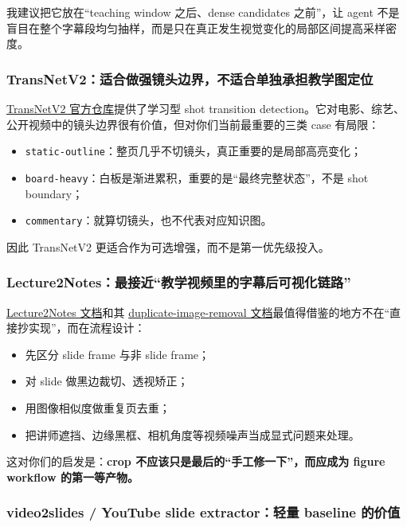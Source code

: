 \documentclass[a4paper]{article}
\begin{document}
我建议把它放在“teaching window 之后、dense candidates 之前”，让 agent 不是盲目在整个字幕段均匀抽样，而是只在真正发生视觉变化的局部区间提高采样密度。

\subsubsection{TransNetV2：适合做强镜头边界，不适合单独承担教学图定位}

\href{https://github.com/soCzech/TransNetV2/blob/master/README.md}{TransNetV2 官方仓库}提供了学习型 shot transition detection。它对电影、综艺、公开视频中的镜头边界很有价值，但对你们当前最重要的三类 case 有局限：

\begin{itemize}
\item \texttt{static-outline}：整页几乎不切镜头，真正重要的是局部高亮变化；
\item \texttt{board-heavy}：白板是渐进累积，重要的是“最终完整状态”，不是 shot boundary；
\item \texttt{commentary}：就算切镜头，也不代表对应知识图。
\end{itemize}

因此 TransNetV2 更适合作为可选增强，而不是第一优先级投入。

\subsubsection{Lecture2Notes：最接近“教学视频里的字幕后可视化链路”}

\href{https://lecture2notes.readthedocs.io/en/latest/end-to-end/frame-extraction.html}{Lecture2Notes 文档}和其 \href{https://lecture2notes.readthedocs.io/en/latest/end-to-end/duplicate-image-removal.html}{duplicate-image-removal 文档}最值得借鉴的地方不在“直接抄实现”，而在流程设计：

\begin{itemize}
\item 先区分 slide frame 与非 slide frame；
\item 对 slide 做黑边裁切、透视矫正；
\item 用图像相似度做重复页去重；
\item 把讲师遮挡、边缘黑框、相机角度等视频噪声当成显式问题来处理。
\end{itemize}

这对你们的启发是：\textbf{crop 不应该只是最后的“手工修一下”，而应成为 figure workflow 的第一等产物。}

\subsubsection{video2slides / YouTube slide extractor：轻量 baseline 的价值}
\end{document}
